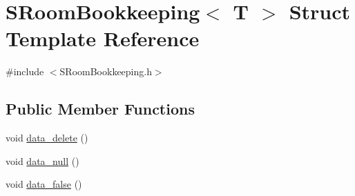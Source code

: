 \hypertarget{structSRoomBookkeeping}{\section{S\-Room\-Bookkeeping$<$ T $>$ Struct Template Reference}
\label{structSRoomBookkeeping}
}


{\ttfamily \#include $<$S\-Room\-Bookkeeping.\-h$>$}

\subsection*{Public Member Functions}
\begin{DoxyCompactItemize}
\item 
void \hyperlink{structSRoomBookkeeping_a61e753ffc1fca946226061ca2c4dd7cf}{data\-\_\-delete} ()
\item 
void \hyperlink{structSRoomBookkeeping_a241246f461b63f280fac2be2749f1a19}{data\-\_\-null} ()
\item 
void \hyperlink{structSRoomBookkeeping_a92c7d19771014726890de2364a2b210a}{data\-\_\-false} ()
\end{DoxyCompactItemize}
